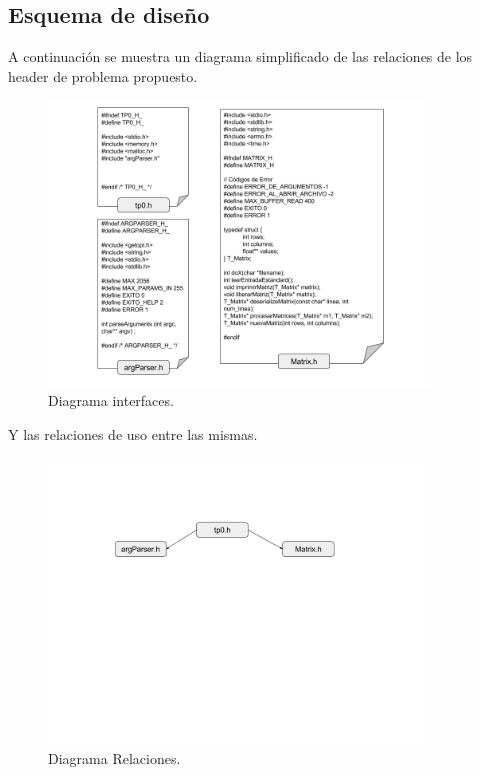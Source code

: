\documentclass[a4paper,10pt]{article}
\begin{document}
\subsection{Esquema de diseño}
A continuación se muestra un diagrama simplificado de las relaciones de los header de problema propuesto.

\begin{figure}[htbp]
	    \centering
		\includegraphics[width=0.90\textwidth]{content/diagrama_h.png}
	    \caption{\scriptsize{Diagrama interfaces.}}
	    \label{fig002}
      \end{figure}

\newpage

Y las relaciones de uso entre las mismas.

\begin{figure}[htbp]
	    \centering
		\includegraphics[width=0.90\textwidth]{content/DiagramaRelaciones.png}
	    \caption{\scriptsize{Diagrama Relaciones.}}
	    \label{fig002}
      \end{figure}
\end{document}
